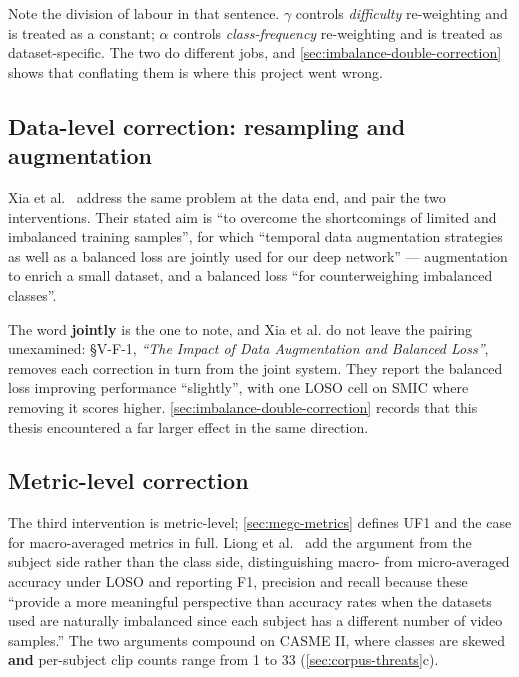 Note the division of labour in that sentence. $\gamma$ controls \textit{difficulty} re-weighting and is treated as a constant; $\alpha$ controls \textit{class-frequency} re-weighting and is treated as dataset-specific. The two do different jobs, and \autoref{sec:imbalance-double-correction} shows that conflating them is where this project went wrong.

\subsection{Data-level correction: resampling and augmentation}
\label{sec:imbalance-balanced-loss}

Xia et al.~\cite{xia2020a} address the same problem at the data end, and pair the two interventions. Their stated aim is ``to overcome the shortcomings of limited and imbalanced training samples'', for which ``temporal data augmentation strategies as well as a balanced loss are jointly used for our deep network'' --- augmentation to enrich a small dataset, and a balanced loss ``for counterweighing imbalanced classes''.

The word \textbf{jointly} is the one to note, and Xia et al. do not leave the pairing unexamined: \S V-F-1, \textit{``The Impact of Data Augmentation and Balanced Loss''}, removes each correction in turn from the joint system. They report the balanced loss improving performance ``slightly'', with one LOSO cell on SMIC where removing it scores higher. \autoref{sec:imbalance-double-correction} records that this thesis encountered a far larger effect in the same direction.

\subsection{Metric-level correction}
\label{sec:imbalance-metrics}

The third intervention is metric-level; \autoref{sec:megc-metrics} defines UF1 and the case for macro-averaged metrics in full. Liong et al.~\cite{liong2016} add the argument from the subject side rather than the class side, distinguishing macro- from micro-averaged accuracy under LOSO and reporting F1, precision and recall because these ``provide a more meaningful perspective than accuracy rates when the datasets used are naturally imbalanced since each subject has a different number of video samples.'' The two arguments compound on CASME II, where classes are skewed \textbf{and} per-subject clip counts range from 1 to 33 (\autoref{sec:corpus-threats}c).

